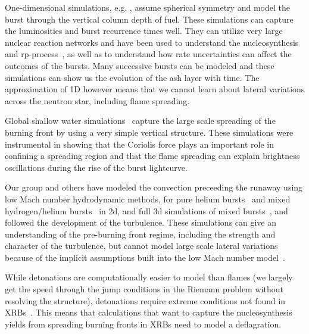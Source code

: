 \documentclass[a4paper]{jpconf}
\begin{document}
One-dimensional simulations, e.g. \cite{woosley-xrb,fisker:2008}, assume
spherical symmetry and model the burst through the vertical column
depth of fuel.  These simulations can capture the luminosities and
burst recurrence times well.  They can utilize very large nuclear
reaction networks and have been used to understand the nucleosynthesis
and rp-process~\cite{schatz:rp1999,rpprocess,schatz_rp}, as well as to understand how rate uncertainties can
affect the outcomes of the bursts.  Many successive bursts can be
modeled and these simulations can show us the evolution of the ash
layer with time.  The approximation of 1D however means that we cannot
learn about lateral variations across the neutron star, including
flame spreading.

Global shallow water simulations~\cite{SPIT_ETAL02} capture the
large scale spreading of the burning front by using a very simple
vertical structure.  These simulations were instrumental in showing
that the Coriolis force plays an important role in confining a
spreading region and that the flame spreading can explain brightness
oscillations during the rise of the burst lightcurve.

Our group and others have modeled the convection preceeding the
runaway using low Mach number hydrodynamic methods, for pure helium
bursts~\cite{Lin:2006,xrb} and mixed hydrogen/helium
bursts~\cite{xrb2} in 2d, and full 3d simulations of mixed
bursts~\cite{xrb3}, and followed the development of the turbulence.
These simulations can give an understanding of the pre-burning front
regime, including the strength and character of the turbulence, but
cannot model large scale lateral variations because of the implicit
assumptions built into the low Mach number model~\cite{ABRZ:I}.

While detonations are computationally easier to model than flames (we
largely get the speed through the jump conditions in the Riemann
problem without resolving the structure), detonations require extreme
conditions not found in XRBs~\cite{ZINGALE_ETAL01,harpole:2018}.
This means that calculations that want to capture the nucleosynthesis
yields from spreading burning fronts in XRBs need to model a deflagration.
\end{document}
